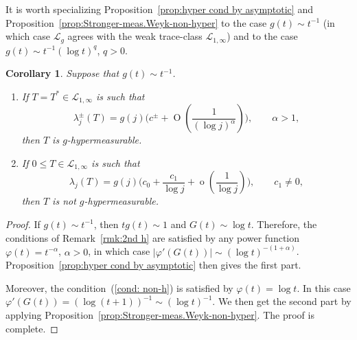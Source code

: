 \documentclass[10pt, a4paper]{amsart}
\newcommand{\sL}{\mathscr{L}}
\newcommand{\op}{\operatorname}
\numberwithin{equation}{section}
\newtheorem{corollary}[theorem]{Corollary}
\theoremstyle{definition}
\theoremstyle{remark}
\begin{document}
It is worth specializing Proposition~\ref{prop:hyper cond by asymptotic}  and Proposition~\ref{prop:Stronger-meas.Weyk-non-hyper} to the case $g(t)\sim t^{-1}$ (in which case $\sL_g$ agrees with the weak trace-class $\sL_{1,\infty}$) and to the case $g(t)\sim t^{-1}(\log t)^q$, $q>0$.

\begin{corollary}\label{cor:Hyper.Weyl-hyper.sLp}
 Suppose that $g(t)\sim t^{-1}$.
 \begin{enumerate}
 \item If $T=T^*\in \sL_{1,\infty}$ is such that
 \begin{equation*}
 \lambda_j^\pm(T) = g(j)\bigg(c^{\pm} + \op{O}\left(\frac{1}{(\log j)^\alpha}\right) \bigg), \qquad \alpha>1,
\end{equation*}
then $T$ is $g$-hypermeasurable.

\item If $0\leq T\in \sL_{1,\infty}$ is such that
   \begin{equation*}
 \lambda_j(T) = g(j)\bigg(c_0 + \frac{c_1}{\log j}+ \op{o}\left(\frac{1}{\log j}\right) \bigg), \qquad c_1\neq 0,
\end{equation*}
then $T$ is not $g$-hypermeasurable.
\end{enumerate}
\end{corollary}
\begin{proof}
If $g(t)\sim t^{-1}$, then $tg(t)\sim 1$ and $G(t)\sim \log t$. Therefore, the conditions of Remark~\ref{rmk:2nd h} are satisfied by any power function $\varphi(t)=t^{-\alpha}$, $\alpha>0$, in which case $|\varphi'(G(t))|\sim (\log t)^{-(1+\alpha)}$. Proposition~\ref{prop:hyper cond by asymptotic} then gives the first part.

Moreover, the condition~(\ref{cond: non-h}) is satisfied by $\varphi(t)=\log t$. In this case $\varphi'(G(t))=(\log (t+1))^{-1}\sim (\log t)^{-1}$. We then get the second part by applying Proposition~\ref{prop:Stronger-meas.Weyk-non-hyper}. The proof is complete.
 \end{proof}
\end{document}
